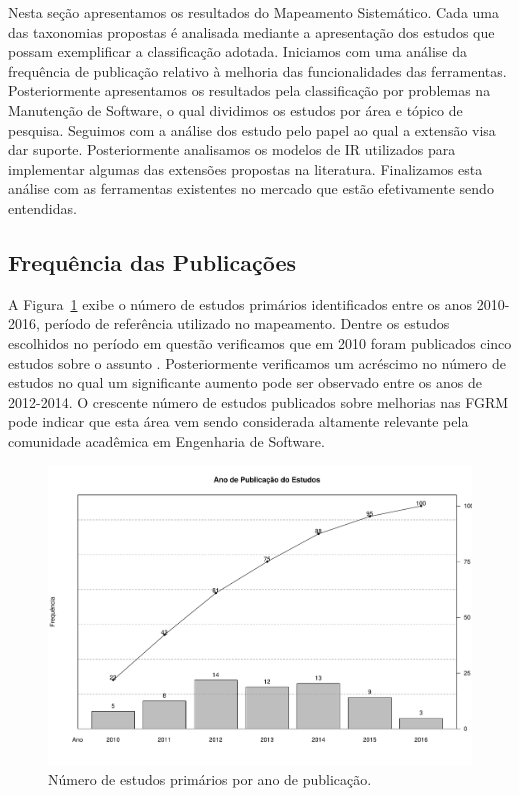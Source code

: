 Nesta seção apresentamos os resultados do Mapeamento Sistemático. Cada uma das
taxonomias propostas é analisada mediante a apresentação dos estudos que possam
exemplificar a classificação adotada.  Iniciamos com uma análise da frequência
de publicação relativo à melhoria das funcionalidades das ferramentas.
Posteriormente apresentamos os resultados pela classificação por problemas na
Manutenção de Software, o qual dividimos os estudos por área e tópico de
pesquisa. Seguimos com a análise dos estudo pelo papel ao qual a extensão visa
dar suporte. Posteriormente analisamos os modelos de IR utilizados para
implementar algumas das extensões propostas na literatura. Finalizamos esta
análise com as ferramentas existentes no mercado que estão efetivamente sendo
entendidas.

\subsection{Frequência das Publicações} \label{sub:frequencia_publicacao}

A Figura~\ref{fig:publicacao_por_ano} exibe o número de estudos primários
identificados entre os anos 2010\@-\@2016, período de referência utilizado no
mapeamento. Dentre os estudos escolhidos no período em questão verificamos que
em 2010 foram publicados cinco estudos sobre o assunto
\cite{sun2010discriminative,gegick2010identifying,song2010jdf,nagwani2010predictive,zimmermann2010makes}.
Posteriormente verificamos um acréscimo no número de estudos no qual um
significante aumento pode ser observado entre os anos de 2012\@-\@2014. O
crescente número de estudos publicados sobre melhorias nas FGRM pode indicar que
esta área vem sendo considerada altamente relevante pela comunidade acadêmica em
Engenharia de Software.

\begin{figure}[htpb] \centering
	\includegraphics[width=0.9\linewidth]{chapter-mapeamento-sistematico/img/ano-publicao-estudos.pdf}
	\caption{Número de estudos primários por ano de publicação.}
	\label{fig:publicacao_por_ano} \end{figure}

